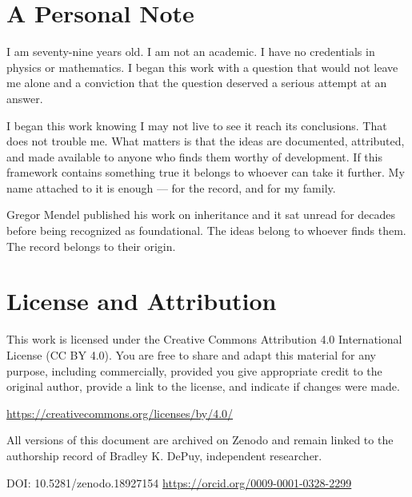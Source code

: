 \documentclass[11pt,letterpaper]{article}
\begin{document}
\section{A Personal Note}
\label{sec:org698cabd}

I am seventy-nine years old. I am not an academic. I have no credentials in physics or mathematics. I began this work with a question that would not leave me alone and a conviction that the question deserved a serious attempt at an answer.

I began this work knowing I may not live to see it reach its conclusions. That does not trouble me. What matters is that the ideas are documented, attributed, and made available to anyone who finds them worthy of development. If this framework contains something true it belongs to whoever can take it further. My name attached to it is enough --- for the record, and for my family.

Gregor Mendel published his work on inheritance and it sat unread for decades before being recognized as foundational. The ideas belong to whoever finds them. The record belongs to their origin.
\section{License and Attribution}
\label{sec:org7e8f06a}

This work is licensed under the Creative Commons Attribution 4.0 International License (CC BY 4.0). You are free to share and adapt this material for any purpose, including commercially, provided you give appropriate credit to the original author, provide a link to the license, and indicate if changes were made.

\url{https://creativecommons.org/licenses/by/4.0/}

All versions of this document are archived on Zenodo and remain linked to the authorship record of Bradley K. DePuy, independent researcher.

DOI: 10.5281/zenodo.18927154
\url{https://orcid.org/0009-0001-0328-2299}
\end{document}
